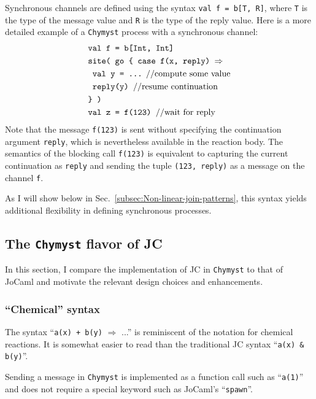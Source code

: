 \documentclass[sigplan,10pt]{acmart}\settopmatter{}
\begin{document}
Synchronous channels are defined using the syntax \texttt{val f =
b{[}T, R{]}}, where \texttt{T} is the type of the message value and
\texttt{R} is the type of the reply value. Here is a more detailed
example of a \texttt{Chymyst} process with a synchronous channel:
\begin{align*}
\text{} & \text{\texttt{val f = b[Int, Int]}}\\
 & \text{\texttt{site( go \{ case f(x, reply) \ensuremath{\Rightarrow}}}\\
 & \text{\text{\texttt{  val y = ...} //compute some value}}\\
 & \text{\texttt{  reply(y) }//resume continuation}\\
 & \text{\texttt{\} )}}\\
 & \text{\texttt{val z = f(123) }//wait for reply}
\end{align*}
Note that the message \texttt{f(123)} is sent without specifying the
continuation argument \texttt{reply}, which is nevertheless available
in the reaction body. The semantics of the blocking call \texttt{f(123)}
is equivalent to capturing the current continuation as \texttt{reply}
and sending the tuple \texttt{(123, reply)} as a message on the channel
\texttt{f}.

As I will show below in Sec.~\ref{subsec:Non-linear-join-patterns},
this syntax yields additional flexibility in defining
synchronous processes.

\subsection{The \texttt{Chymyst} flavor of JC}

In this section, I compare the implementation of JC in \texttt{Chymyst}
to that of JoCaml and motivate the relevant design choices and enhancements.

\subsubsection{``Chemical'' syntax}

The syntax ``\texttt{a(x) + b(y)} $\Rightarrow$ ...'' is reminiscent
of the notation for chemical reactions. It is somewhat easier to read
than the traditional JC syntax ``\texttt{a(x) \& b(y)}''.

Sending a message in \texttt{Chymyst} is implemented as a function
call such as ``\texttt{a(1)}'' and does not require a special keyword
such as JoCaml's ``\texttt{spawn}''.
\end{document}
